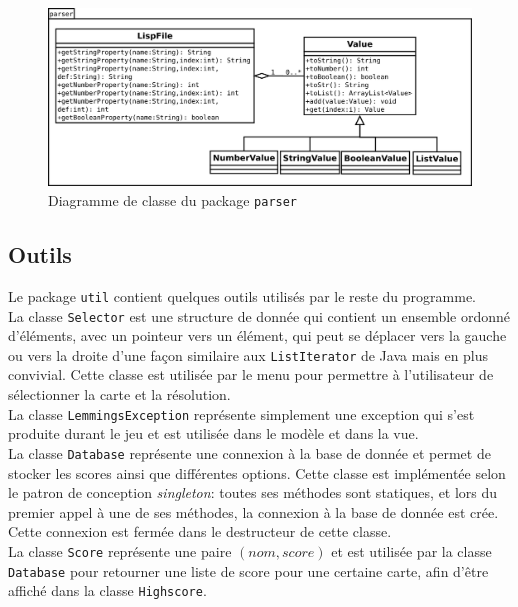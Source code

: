 \documentclass[a4paper,12pt]{article}
\begin{document}
\begin{figure}[ht!]
  \centerline{
  \includegraphics[width=\textwidth]{parser.png}}
  \caption{Diagramme de classe du package \texttt{parser}}
\end{figure}

\subsection{Outils}
Le package \texttt{util} contient quelques outils utilisés par le
reste du programme.\\

La classe \texttt{Selector} est une structure de donnée qui contient
un ensemble ordonné d'éléments, avec un pointeur vers un élément, qui
peut se déplacer vers la gauche ou vers la droite d'une façon
similaire aux \texttt{ListIterator} de Java mais en plus
convivial. Cette classe est utilisée par le menu pour permettre à
l'utilisateur de sélectionner la carte et la résolution.\\

La classe \texttt{LemmingsException} représente simplement une
exception qui s'est produite durant le jeu et est utilisée dans le
modèle et dans la vue.\\

La classe \texttt{Database} représente une connexion à la base de
donnée et permet de stocker les scores ainsi que différentes
options. Cette classe est implémentée selon le patron de conception
\emph{singleton}: toutes ses méthodes sont statiques, et lors du
premier appel à une de ses méthodes, la connexion à la base de donnée
est crée. Cette connexion est fermée dans le destructeur de cette
classe.\\

La classe \texttt{Score} représente une paire $(nom, score)$ et est
utilisée par la classe \texttt{Database} pour retourner une liste de
score pour une certaine carte, afin d'être affiché dans la classe
\texttt{Highscore}.
\end{document}
